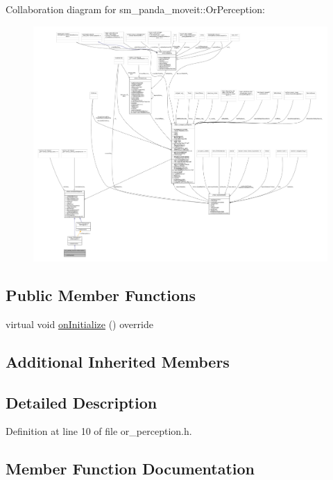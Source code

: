 Collaboration diagram for sm\+\_\+panda\+\_\+moveit\+:\+:Or\+Perception\+:
\nopagebreak
\begin{figure}[H]
\begin{center}
\leavevmode
\includegraphics[width=350pt]{classsm__panda__moveit_1_1OrPerception__coll__graph}
\end{center}
\end{figure}
\subsection*{Public Member Functions}
\begin{DoxyCompactItemize}
\item 
virtual void \hyperlink{classsm__panda__moveit_1_1OrPerception_a8c56730ba1bf586db575356ea414b3ee}{on\+Initialize} () override
\end{DoxyCompactItemize}
\subsection*{Additional Inherited Members}


\subsection{Detailed Description}


Definition at line 10 of file or\+\_\+perception.\+h.



\subsection{Member Function Documentation}
\mbox{\label{classsm__panda__moveit_1_1OrPerception_a8c56730ba1bf586db575356ea414b3ee}} 
